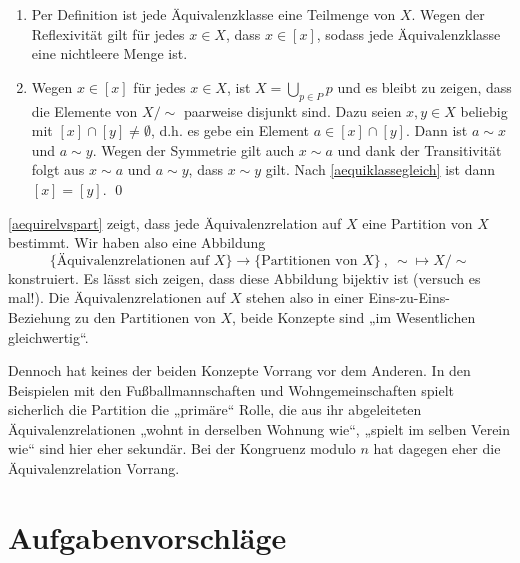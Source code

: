 \begin{bew}
\begin{enumerate}[(P1)]
    \item Per Definition ist jede Äquivalenzklasse eine Teilmenge von $X$. Wegen der Reflexivität gilt für jedes $x\in X$, dass $x\in[x]$, sodass jede Äquivalenzklasse eine nichtleere Menge ist.
    \item Wegen $x\in [x]$ für jedes $x\in X$, ist $X=\bigcup_{p\in P} p$ und es bleibt zu zeigen, dass die Elemente von $X/{\sim}$ paarweise disjunkt sind. Dazu seien $x,y\in X$ beliebig mit $[x]\cap [y]\neq \emptyset$, d.h. es gebe ein Element $a\in [x]\cap [y]$. Dann ist $a\sim x$ und $a\sim y$. Wegen der Symmetrie gilt auch $x\sim a$ und dank der Transitivität folgt aus $x\sim a$ und $a\sim y$, dass $x\sim y$ gilt. Nach \cref{aequiklassegleich} ist dann $[x]=[y]$. \qed
\end{enumerate}
\end{bew}


\begin{bem}
    \cref{aequirelvspart} zeigt, dass jede Äquivalenzrelation auf $X$ eine Partition von $X$ bestimmt. Wir haben also eine Abbildung
        \[ \{ \text{Äquivalenzrelationen auf $X$}\} \to \{ \text{Partitionen von $X$}\} \ ,\ {\sim} \mapsto X/{\sim} \]
    konstruiert. Es lässt sich zeigen, dass diese Abbildung bijektiv ist (versuch es mal!). Die Äquivalenzrelationen auf $X$ stehen also in einer Eins-zu-Eins-Beziehung zu den Partitionen von $X$, beide Konzepte sind „im Wesentlichen gleichwertig“.
    
    Dennoch hat keines der beiden Konzepte Vorrang vor dem Anderen. In den Beispielen mit den Fußballmannschaften und Wohngemeinschaften spielt sicherlich die Partition die „primäre“ Rolle, die aus ihr abgeleiteten Äquivalenzrelationen „wohnt in derselben Wohnung wie“, „spielt im selben Verein wie“ sind hier eher sekundär. Bei der Kongruenz modulo $n$ hat dagegen eher die Äquivalenzrelation Vorrang.
\end{bem}





\clearpage
\section{Aufgabenvorschläge}


